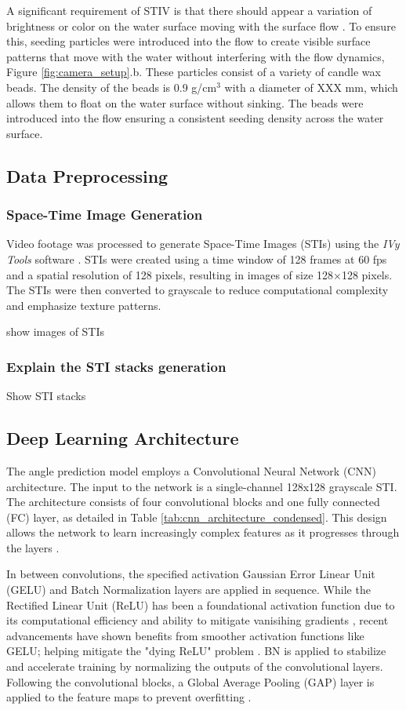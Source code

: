 \documentclass[12pt]{elsarticle}
\begin{document}
A significant requirement of STIV is that there should appear a variation of brightness or color on the water surface moving with the surface flow \cite{fujita2007development}. To ensure this, seeding particles were introduced into the flow to create visible surface patterns that move with the water without interfering with the flow dynamics, Figure \ref{fig:camera_setup}.b. These particles consist of a variety of candle wax beads. The density of the beads is 0.9 g/cm$^3$ with a diameter of XXX mm, which allows them to float on the water surface without sinking. The beads were introduced into the flow ensuring a consistent seeding density across the water surface.
\subsection{Data Preprocessing}
\subsubsection{Space-Time Image Generation}
Video footage was processed to generate Space-Time Images (STIs) using the \textit{IVy Tools} software \cite{engel2025ivytools}. STIs were created using a time window of 128 frames at 60 fps and a spatial resolution of 128 pixels, resulting in images of size 128×128 pixels. The STIs were then converted to grayscale to reduce computational complexity and emphasize texture patterns.

show images of STIs

\subsubsection{Explain the STI stacks generation}

Show STI stacks
\subsection{Deep Learning Architecture}
The angle prediction model employs a Convolutional Neural Network (CNN) architecture. The input to the network is a single-channel 128x128 grayscale STI. The architecture consists of four convolutional blocks and one fully connected (FC) layer, as detailed in Table \ref{tab:cnn_architecture_condensed}. This design allows the network to learn increasingly complex features as it progresses through the layers \cite{zeiler2014visualizing}.

In between convolutions, the specified activation Gaussian Error Linear Unit (GELU) and Batch Normalization layers are applied in sequence. While the Rectified Linear Unit (ReLU) has been a foundational activation function due to its computational efficiency and ability to mitigate vanisihing gradients \cite{pmlr-v15-glorot11a}, recent advancements have shown benefits from smoother activation functions like GELU; helping mitigate the "dying ReLU" problem \cite{hendrycks2016GELU, lu2019dying}. BN is applied to stabilize and accelerate training \cite{ioffe2015batch} by normalizing the outputs of the convolutional layers. Following the convolutional blocks, a Global Average Pooling (GAP) layer is applied to the feature maps to prevent overfitting \cite{lin2013GAP, watanabe2021improving}. 
\end{document}
